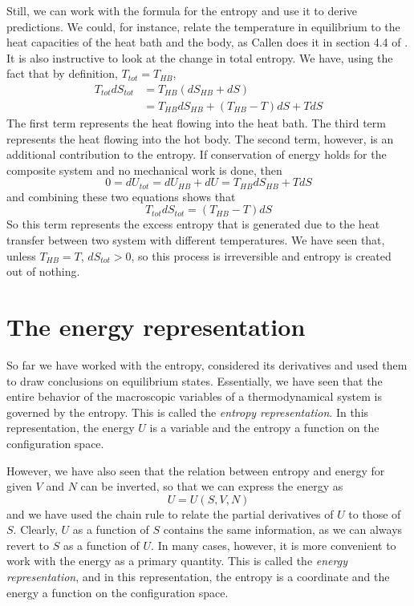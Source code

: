 \documentclass[a4paper, draft]{article}
\theoremstyle{own}
\theoremstyle{remark}
\begin{document}
Still, we can work with the formula for the entropy and use it to derive predictions. We could, for instance, relate the temperature in equilibrium to the heat capacities of the heat bath and the body, as Callen does it in section 4.4 of \cite{Callen}. It is also instructive to look at the change in total entropy. We have, using the fact that by definition, $T_{tot} = T_{HB}$, 
\begin{align*}
T_{tot} dS_{tot} &= T_{HB} (dS_{HB} + dS)  \\
&= T_{HB} dS_{HB} + (T_{HB} - T) dS + T dS
\end{align*}
The first term represents the heat flowing into the heat bath. The third term represents the heat flowing into the hot body. The second term, however, is an additional contribution to the entropy. If conservation of energy holds for the composite system and no mechanical work is done, then
$$
0 = dU_{tot} = dU_{HB} + dU = T_{HB} dS_{HB}  + T dS
$$
and combining these two equations shows that
$$
T_{tot} dS_{tot} = (T_{HB} - T) dS
$$
So this term represents the excess entropy that is generated due to the heat transfer between two system with different temperatures. We have seen that, unless $T_{HB} = T$, $dS_{tot} > 0$, so this process is irreversible and entropy is created out of nothing.


\section{The energy representation}

So far we have worked with the entropy, considered its derivatives and used them to draw conclusions on equilibrium states. Essentially, we have seen that the entire behavior of the macroscopic variables of a thermodynamical system is governed by the entropy. This is called the {\em entropy representation}. In this representation, the energy $U$ is a variable and the entropy a function on the configuration space.

However, we have also seen that the relation between entropy and energy for given $V$ and $N$ can be inverted, so that we can express the energy as
$$
U = U(S,V,N)
$$
and we have used the chain rule to relate the partial derivatives of $U$ to those of $S$. Clearly, $U$ as a function of $S$ contains the same information, as we can always revert to $S$ as a function of $U$. In many cases, however, it is more convenient to work with the energy as a primary quantity. This is called the {\em energy representation}, and in this representation, the entropy is a coordinate and the energy a function on the configuration space.
\end{document}
